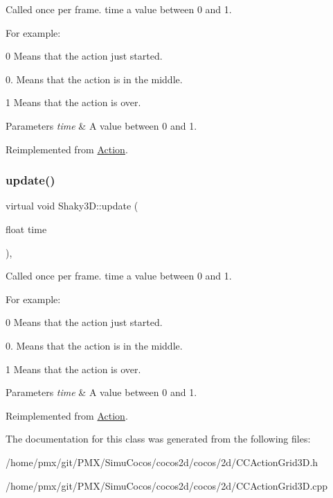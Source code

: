 Called once per frame. time a value between 0 and 1.

For example\+:
\begin{DoxyItemize}
\item 0 Means that the action just started.
\item 0. Means that the action is in the middle.
\item 1 Means that the action is over.
\end{DoxyItemize}


\begin{DoxyParams}{Parameters}
{\em time} & A value between 0 and 1. \\
\hline
\end{DoxyParams}


Reimplemented from \hyperlink{classAction_a937e646e63915e33ad05ba149bfcf239}{Action}.

\mbox{\label{classShaky3D_a8842ea9ddb66c7db93595e96d413f603}} 
\subsubsection{\texorpdfstring{update()}{update()}\hspace{0.1cm}{\footnotesize\ttfamily [2/2]}}
{\footnotesize\ttfamily virtual void Shaky3\+D\+::update (\begin{DoxyParamCaption}\item[{float}]{time }\end{DoxyParamCaption})\hspace{0.3cm}{\ttfamily [override]}, {\ttfamily [virtual]}}

Called once per frame. time a value between 0 and 1.

For example\+:
\begin{DoxyItemize}
\item 0 Means that the action just started.
\item 0. Means that the action is in the middle.
\item 1 Means that the action is over.
\end{DoxyItemize}


\begin{DoxyParams}{Parameters}
{\em time} & A value between 0 and 1. \\
\hline
\end{DoxyParams}


Reimplemented from \hyperlink{classAction_a937e646e63915e33ad05ba149bfcf239}{Action}.



The documentation for this class was generated from the following files\+:\begin{DoxyCompactItemize}
\item 
/home/pmx/git/\+P\+M\+X/\+Simu\+Cocos/cocos2d/cocos/2d/C\+C\+Action\+Grid3\+D.\+h\item 
/home/pmx/git/\+P\+M\+X/\+Simu\+Cocos/cocos2d/cocos/2d/C\+C\+Action\+Grid3\+D.\+cpp\end{DoxyCompactItemize}
